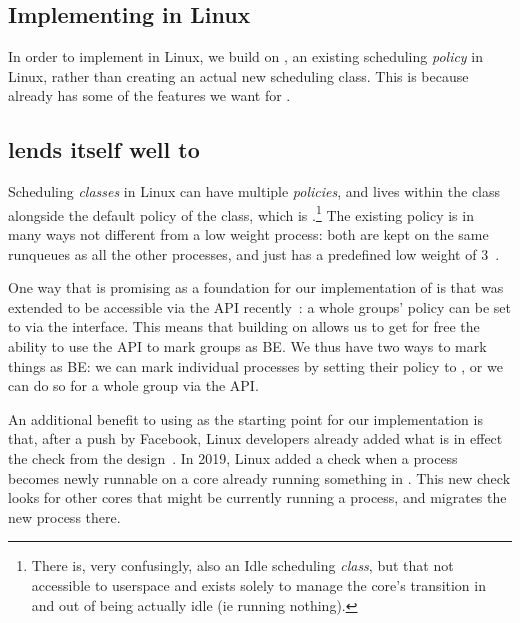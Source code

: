 \subsection{Implementing \beclass{} in Linux}


In order to implement \beclass{} in Linux, we build on \schedidle{}, an existing
scheduling \textit{policy} in Linux, rather than creating an actual new
scheduling class. This is because \schedidle{} already has some of the features
we want for \beclass{}.

\subsection{\schedidle{} lends itself well to \beclass{}}

Scheduling \textit{classes} in Linux can have multiple \textit{policies}, and
\schedidle{} lives within the \normalclass{} class alongside the default policy
of the \normalclass{} class, which is \schednormal{}.\footnote{There is, very
confusingly, also an Idle scheduling \textit{class}, but that not accessible to
userspace and exists solely to manage the core's transition in and out of being
actually idle (ie running nothing).} The existing \schedidle{} policy is in many
ways not different from a low weight \schednormal{} process: both are kept on
the same runqueues as all the other \schednormal{} processes, and \schedidle{}
just has a predefined low weight of 3~\cite{weight-idleprio}.

One way that \schedidle{} is promising as a foundation for our implementation of
\beclass{} is that \schedidle{} was extended to be accessible via the \cgroups{}
API recently~\cite{lkml-idle-cgroup}: a whole groups' policy can be set to
\schedidle{} via the \cgroups{} interface. This means that building on
\schedidle{} allows us to get for free the ability to use the \cgroups{} API to
mark groups as BE. We thus have two ways to mark things as BE: we can mark
individual processes by setting their policy to \schedidle{}, or we can do so
for a whole group via the \cgroups{} API.

An additional benefit to using \schedidle{} as the starting point for our
implementation is that, after a push by Facebook, Linux developers already added
what is in effect the \entry{} check from the \beclass{}
design~\cite{fixing-idle-article}. In 2019, Linux added a check when a
\schednormal{} process becomes newly runnable on a core already running something
in \schednormal{}. This new check looks for other cores that might be currently
running a \schedidle{} process, and migrates the new process there.

